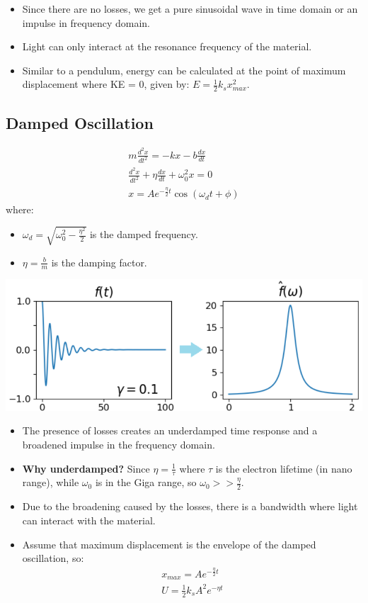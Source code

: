 \documentclass[11pt]{article}
\begin{document}
\begin{itemize}
    \item Since there are no losses, we get a pure sinusoidal wave in time domain or an impulse in frequency domain.
    \item Light can only interact at the resonance frequency of the material.
    \item Similar to a pendulum, energy can be calculated at the point of maximum displacement where KE = 0, given by: $E = \frac{1}{2}k_sx_{max}^2$.
\end{itemize}

\subsection{Damped Oscillation}
\begin{align*}
    m\frac{d^2x}{dt^2} = -kx - b\frac{dx}{dt} \\
    \frac{d^2x}{dt^2} + \eta\frac{dx}{dt} + \omega_0^2 x = 0 \\
    x = Ae^{-\frac{\eta}{2}t}\cos(\omega_d t + \phi)
\end{align*}
where:
\begin{itemize}
    \item $\omega_d = \sqrt{\omega_0^2 - \frac{\eta^2}{2}}$ is the damped frequency.
    \item $\eta = \frac{b}{m}$ is the damping factor.
\end{itemize}

\begin{center}
    \includegraphics[scale=0.7]{2.png}
\end{center}

\begin{itemize}
    \item The presence of losses creates an underdamped time response and a broadened impulse in the frequency domain.
    \item \textbf{Why underdamped?} Since $\eta = \frac{1}{\tau}$ where $\tau$ is the electron lifetime (in nano range), while $\omega_0$ is in the Giga range, so $\omega_0 >> \frac{\eta}{2}$.
    \item Due to the broadening caused by the losses, there is a bandwidth where light can interact with the material.
    \item Assume that maximum displacement is the envelope of the damped oscillation, so:
        \begin{align*}
            x_{max} = Ae^{-\frac{\eta}{2}t} \\
            U = \frac{1}{2}k_sA^2e^{-\eta t}
        \end{align*}
\end{itemize}
\end{document}
